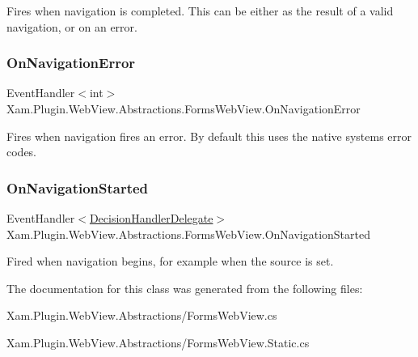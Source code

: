 Fires when navigation is completed. This can be either as the result of a valid navigation, or on an error. 

\mbox{\label{class_xam_1_1_plugin_1_1_web_view_1_1_abstractions_1_1_forms_web_view_a7c716b3098bfaa7c557ec49b89175055}} 
\subsubsection{\texorpdfstring{On\+Navigation\+Error}{OnNavigationError}}
{\footnotesize\ttfamily Event\+Handler$<$int$>$ Xam.\+Plugin.\+Web\+View.\+Abstractions.\+Forms\+Web\+View.\+On\+Navigation\+Error}



Fires when navigation fires an error. By default this uses the native systems error codes. 

\mbox{\label{class_xam_1_1_plugin_1_1_web_view_1_1_abstractions_1_1_forms_web_view_a87f3b76fb88fd4467d6f8f715af1645d}} 
\subsubsection{\texorpdfstring{On\+Navigation\+Started}{OnNavigationStarted}}
{\footnotesize\ttfamily Event\+Handler$<$\hyperlink{class_xam_1_1_plugin_1_1_web_view_1_1_abstractions_1_1_delegates_1_1_decision_handler_delegate}{Decision\+Handler\+Delegate}$>$ Xam.\+Plugin.\+Web\+View.\+Abstractions.\+Forms\+Web\+View.\+On\+Navigation\+Started}



Fired when navigation begins, for example when the source is set. 



The documentation for this class was generated from the following files\+:\begin{DoxyCompactItemize}
\item 
Xam.\+Plugin.\+Web\+View.\+Abstractions/Forms\+Web\+View.\+cs\item 
Xam.\+Plugin.\+Web\+View.\+Abstractions/Forms\+Web\+View.\+Static.\+cs\end{DoxyCompactItemize}
